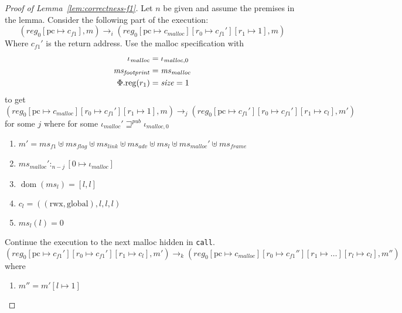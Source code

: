 \documentclass[a4paper]{article}
\newcommand{\update}[2]{[#1 \mapsto #2]}
\DeclareMathOperator{\dom}{dom}
\newcommand{\var}[1]{\mathit{#1}}
\newcommand{\hs}{\var{ms}}
\newcommand{\ms}{\hs}
\newcommand{\pcreg}{\mathrm{pc}}
\newcommand{\reg}{\var{reg}}
\newcommand{\heap}{\var{mem}}
\newcommand{\adv}{\var{adv}}
\newcommand{\flag}{\var{flag}}
\newcommand{\plainproj}[1]{\mathrm{#1}}
\newcommand{\memreg}[1][\Phi]{#1.\plainproj{reg}}
\newcommand{\futurewk}{\mathbin{\sqsupseteq}^{\var{pub}}}
\newcommand{\heapSat}[3][\heap]{#1 :_{#2} #3}
\newcommand{\codelabel}[1]{\mathit{#1}}
\newcommand{\malloc}{\codelabel{malloc}}
\newcommand{\plainperm}[1]{\mathrm{#1}}
\newcommand{\rwx}{\plainperm{rwx}}
\newcommand{\glob}{\plainperm{global}}
\newcommand{\step}[1][]{\rightarrow_{#1}}
\begin{document}
              \begin{proof}[Proof of Lemma~\ref{lem:correctness-f1}]
                Let $n$ be given and assume the premises in the lemma.  Consider the following part of the execution:
                \[
                  (\reg_0\update{\pcreg}{c_{f1}},m) \step[i] (\reg_0\update{\pcreg}{c_\malloc}\update{r_0}{c_{f1}'}\update{r_1}{1},m)
                \]
                Where $c_{f1}'$ is the return address. Use the malloc specification with
                \begin{align*}
                  \iota_\malloc &= \iota_{\malloc,0} \\
                  \ms_{\var{footprint}} & = \ms_\malloc \\
                  \memreg(r_1) & = \size = 1
                \end{align*}
                to get 
                \[
                  (\reg_0\update{\pcreg}{c_\malloc}\update{r_0}{c_{f1}'}\update{r_1}{1},m) \step[j] (\reg_0\update{\pcreg}{c_{f1}'}\update{r_0}{c_{f1}'}\update{r_1}{c_l},m')
                \]
                for some $j$ where for some $\iota_{\malloc}' \futurewk \iota_{\malloc,0}$
                \begin{enumerate}
                \item $m' = \hs_{f1} \uplus 
                  \hs_\flag \uplus                
                  \ms_{\var{link}} \uplus 
                  \hs_\adv \uplus 
                  \ms_l \uplus
                  \ms_{\malloc}' \uplus 
                  \hs_{\var{frame}} $
                \item $\heapSat[\ms_{\malloc}']{n-j}{[0 \mapsto \iota_{\malloc}]}$ \label{f1:mallocsat}
                \item $\dom(\hs_l) = [l,l]$
                \item $c_l = ((\rwx,\glob),l,l,l)$ \label{test}
                \item $\ms_l(l) = 0$
                \end{enumerate}
                Continue the execution to the next malloc hidden in \texttt{call}.
                \[
                  (\reg_0\update{\pcreg}{c_{f1}'}\update{r_0}{c_{f1}'}\update{r_1}{c_l},m')
                  \step[k]
                  (\reg_0\update{\pcreg}{c_\malloc}\update{r_0}{c_{f1}''}\update{r_1}{\dots}\update{r_l}{c_l},m'')
                \]
                where
                \begin{enumerate}[resume]
                \item $m'' = m'[l\mapsto 1]$

\end{enumerate}
\end{proof}
\end{document}
